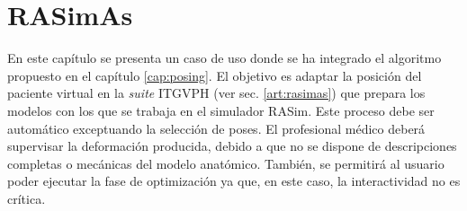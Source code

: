 \chapter{RASimAs} 
\label{cap:rasim}


En este capítulo se presenta un caso de uso donde se ha integrado el algoritmo propuesto en el capítulo \ref{cap:posing}. El objetivo es adaptar la posición del paciente virtual en la \emph{suite} \ac{ITGVPH} (ver sec. \ref{art:rasimas}) que prepara los modelos con los que se trabaja en el simulador \ac{RASim}. Este proceso debe ser automático exceptuando la selección de poses. El profesional médico deberá supervisar la deformación producida, debido a que no se dispone de descripciones completas o mecánicas del modelo anatómico. También, se permitirá al usuario poder ejecutar la fase de optimización ya que, en este caso, la interactividad no es crítica. %






